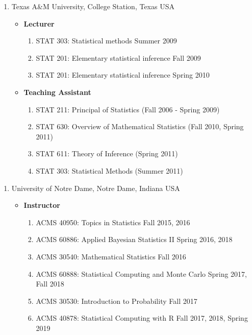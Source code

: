 \documentclass[
]{book}
\providecommand{\tightlist}{%
  \setlength{\itemsep}{0pt}\setlength{\parskip}{0pt}}
\begin{document}
\begin{enumerate}
\def\labelenumi{\arabic{enumi}.}
\item
  Texas A\&M University, College Station, Texas USA

  \begin{itemize}
  \tightlist
  \item
    \textbf{Lecturer}

    \begin{enumerate}
    \def\labelenumii{\arabic{enumii}.}
    \tightlist
    \item
      STAT 303: Statistical methods Summer 2009
    \item
      STAT 201: Elementary statistical inference Fall 2009
    \item
      STAT 201: Elementary statistical inference Spring 2010
    \end{enumerate}
  \item
    \textbf{Teaching Assistant}

    \begin{enumerate}
    \def\labelenumii{\arabic{enumii}.}
    \tightlist
    \item
      STAT 211: Principal of Statistics (Fall 2006 - Spring 2009)
    \item
      STAT 630: Overview of Mathematical Statistics (Fall 2010, Spring 2011)
    \item
      STAT 611: Theory of Inference (Spring 2011)
    \item
      STAT 303: Statistical Methods (Summer 2011)
    \end{enumerate}
  \end{itemize}
\end{enumerate}

\begin{enumerate}
\def\labelenumi{\arabic{enumi}.}
\setcounter{enumi}{1}
\item
  University of Notre Dame, Notre Dame, Indiana USA

  \begin{itemize}
  \tightlist
  \item
    \textbf{Instructor}

    \begin{enumerate}
    \def\labelenumii{\arabic{enumii}.}
    \tightlist
    \item
      ACMS 40950: Topics in Statistics Fall 2015, 2016
    \item
      ACMS 60886: Applied Bayesian Statistics II Spring 2016, 2018
    \item
      ACMS 30540: Mathematical Statistics Fall 2016
    \item
      ACMS 60888: Statistical Computing and Monte Carlo Spring 2017, Fall 2018
    \item
      ACMS 30530: Introduction to Probability Fall 2017
    \item
      ACMS 40878: Statistical Computing with R Fall 2017, 2018, Spring 2019
    \end{enumerate}
  \end{itemize}
\end{enumerate}
\end{document}
